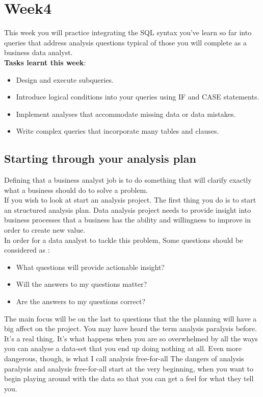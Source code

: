 \documentclass{article}
\begin{document}
\section*{Week4}

This week you will practice integrating the SQL syntax you’ve learn so far into queries that address analysis questions typical of those you will complete as a business data analyst.\\

\textbf{Tasks learnt this week}:
\begin{itemize}
\item Design and execute subqueries.
\item Introduce logical conditions into your queries using IF and CASE statements.
\item Implement analyses that accommodate missing data or data mistakes.
\item Write complex queries that incorporate many tables and clauses.
\end{itemize}

\subsection*{Starting through your analysis plan}

Defining that a business analyst job is to do something that will clarify exactly what a business should do to solve a problem.\\

\noindent If you wish to look at start an analysis project. The first thing you do is to start an structured analysis plan. Data analysis project needs to provide insight into business processes that a business has the ability and willingness to improve in order to create new value. \\

In order for a data analyst to tackle this problem, Some questions should be considered as :
\begin{itemize}
\item What questions will provide actionable insight?
\item Will the answers to my questions matter? 
\item Are the answers to my questions correct?
\end{itemize}

The main focus will be on the last to questions that the the planning will have a big affect on the project. You may have heard the term analysis paralysis before. It's a real thing. It's what happens when you are so overwhelmed by all the ways you can analyse a data-set that you end up doing nothing at all. Even more dangerous, though, is what I call analysis free-for-all The dangers of analysis paralysis and analysis free-for-all start at the very beginning, when you want to begin playing around with the data so that you can get a feel for what they tell you.
\end{document}

